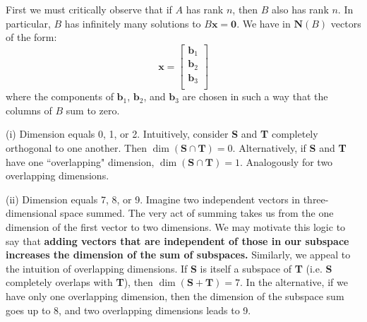 \documentclass[a4paper]{article}
\begin{document}

First we must critically observe that if \(A\) has rank \(n\), then \(B\) also has rank \(n\). In particular, \(B\) has infinitely many solutions to \(B \bm{x} = \bm{0}\). We have in \(\textbf{N}\!\left( B \right) \) vectors of the form:
\[
	\bm{x} =
	\begin{bmatrix}
		\bm{b}_{1} \\
		\bm{b}_{2} \\
		\bm{b}_{3} \\
	\end{bmatrix}
\]
where the components of \(\bm{b}_{1}\), \(\bm{b}_{2}\), and \(\bm{b}_{3}\) are chosen in such a way that the columns of \(B\) sum to zero. 

\vspace{12pt}


(i) Dimension equals 0, 1, or 2. Intuitively, consider \textbf{S} and \textbf{T} completely orthogonal to one another. Then \(\dim \!\left( \textbf{S} \cap  \textbf{T} \right) = 0 \). Alternatively, if \textbf{S} and \textbf{T} have one ``overlapping" dimension, \(\dim \!\left( \textbf{S} \cap \textbf{T} \right) = 1\). Analogously for two overlapping dimensions.

\vspace{12pt}

(ii) Dimension equals 7, 8, or 9. Imagine two independent vectors in three-dimensional space summed. The very act of summing takes us from the one dimension of the first vector to two dimensions. We may motivate this logic to say that \textbf{adding vectors that are independent of those in our subspace increases the dimension of the sum of subspaces.} Similarly, we appeal to the intuition of overlapping dimensions. If \textbf{S} is itself a subspace of \textbf{T} (i.e. \textbf{S} completely overlaps with \textbf{T}), then \(\dim \!\left( \textbf{S} + \textbf{T} \right) = 7\). In the alternative, if we have only one overlapping dimension, then the dimension of the subspace sum goes up to 8, and two overlapping dimensions leads to 9. 
\end{document}
